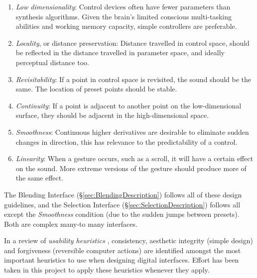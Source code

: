 \documentclass[11pt, oneside]{report}   	%
\begin{document}
\begin{enumerate}
	\vspace{-10pt}
\setlength\itemsep{-1.2em}
	\item \emph{Low dimensionality}: Control devices often have fewer parameters than synthesis algorithms. Given the brain's limited conscious multi-tasking abilities and working memory capacity, simple controllers are preferable.
	\item \emph{Locality}, or distance preservation: Distance travelled in control space, should be reflected in the distance travelled in parameter space, and ideally perceptual distance too.
	\item \emph{Revisitability}: If a point in control space is revisited, the sound should be the same. The location of preset points should be stable.
	\item \emph{Continuity}: If a point is adjacent to another point on the low-dimensional surface, they should be adjacent in the high-dimensional space.
	\item \emph{Smoothness}: Continuous higher derivatives are desirable to eliminate sudden changes in direction, this has relevance to the predictability of a control.
	\item \emph{Linearity}: When a gesture occurs, such as a scroll, it will have a certain effect on the sound. More extreme versions of the gesture should produce more of the same effect. %
	\vspace{-10pt}
\end{enumerate}
The Blending Interface (\S \ref{sec:BlendingDescription}) follows all of these design guidelines, and the Selection Interface (\S \ref{sec:SelectionDescription}) follows all except the \emph{Smoothness} condition (due to the sudden jumps between presets). Both are complex many-to many interfaces.

In a review of \emph{usability heuristics} \cite{Consistency}, consistency, aesthetic integrity (simple design) and forgiveness (reversible computer actions) are identified amongst the most important heuristics to use when designing digital interfaces. Effort has been taken in this project to apply these heuristics whenever they apply.
\end{document}
